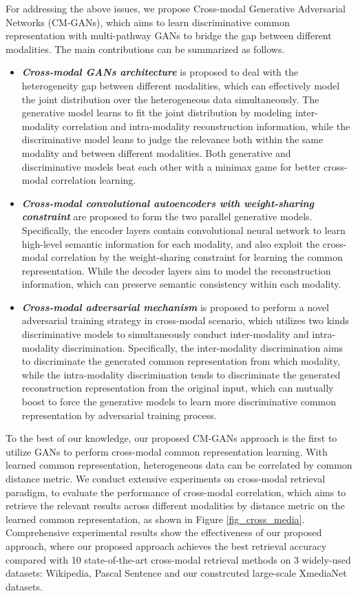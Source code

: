 \documentclass[journal]{IEEEtran}
\begin{document}
For addressing the above issues, we propose Cross-modal Generative Adversarial Networks (CM-GANs), which aims to learn discriminative common representation with multi-pathway GANs to bridge the gap between different modalities. The main contributions can be summarized as follows.
\begin{itemize}
	\item{
		\textbf{\textit{Cross-modal GANs architecture}} is proposed to deal with the heterogeneity gap between different modalities, which can effectively model the joint distribution over the heterogeneous data simultaneously. The generative model learns to fit the joint distribution by modeling inter-modality correlation and intra-modality reconstruction information, while the discriminative model leans to judge the relevance both within the same modality and between different modalities. Both generative and discriminative models beat each other with a minimax game for better cross-modal correlation learning.
	} 
	\item{
		\textbf{\textit{Cross-modal convolutional autoencoders with weight-sharing constraint}} are proposed to form the two parallel generative models. Specifically, the encoder layers contain convolutional neural network to learn high-level semantic information for each modality, and also exploit the cross-modal correlation by the weight-sharing constraint for learning the common representation. While the decoder layers aim to model the reconstruction information, which can preserve semantic consistency within each modality.
	} 
	\item{
		\textbf{\textit{Cross-modal adversarial mechanism}} is proposed to perform a novel adversarial training strategy in cross-modal scenario, which utilizes two kinds discriminative models to simultaneously conduct inter-modality and intra-modality discrimination. Specifically, the inter-modality discrimination aims to discriminate the generated common representation from which modality, while the intra-modality discrimination tends to discriminate the generated reconstruction representation from the original input, which can mutually boost to force the generative models to learn more discriminative common representation by adversarial training process.
	} 
\end{itemize}

To the best of our knowledge, our proposed CM-GANs approach is the first to utilize GANs to perform cross-modal common representation learning. 
With learned common representation, heterogeneous data can be correlated by common distance metric. We conduct extensive experiments on cross-modal retrieval paradigm, to evaluate the performance of cross-modal correlation, which aims to retrieve the relevant results across different modalities by distance metric on the learned common representation, as shown in Figure \ref{fig_cross_media}. Comprehensive experimental results show the effectiveness of our proposed approach, where our proposed approach achieves the best retrieval accuracy compared with 10 state-of-the-art cross-modal retrieval methods on 3 widely-used datasets: Wikipedia, Pascal Sentence and our constrcuted large-scale XmediaNet datasets.
\end{document}
